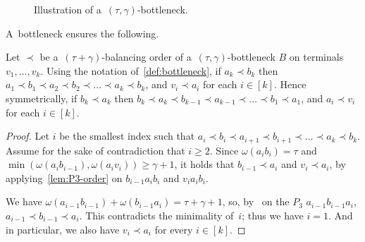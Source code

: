 \documentclass[a4paper,UKenglish,cleveref,hyperref,autoref]{lipics-v2021}
\newcommand{\weight}{\omega}
\begin{document}
\begin{figure}[h!]
\centering
\caption{Illustration of a~$(\tau,\gamma)$-bottleneck.}
\label{fig:bottleneck}
\end{figure}

A~bottleneck ensures the following.

\begin{lemma}\label{lem:bottle-order}
Let $\prec$ be a~$(\tau + \gamma)$-balancing order of a~$(\tau, \gamma)$-bottleneck $B$ on terminals $v_1, \dots, v_k$.
Using the notation of~\cref{def:bottleneck}, if $a_k \prec b_k$ then $a_1 \prec b_1 \prec a_2 \prec b_2 \prec \dots \prec a_k \prec b_k$, and $v_i \prec a_i$ for each $i \in [k]$.
Hence symmetrically, if $b_k \prec a_k$ then $b_k \prec a_k \prec b_{k-1} \prec a_{k-1} \prec \dots \prec b_1 \prec a_1$, and $a_i \prec v_i$ for each $i \in [k]$.
\end{lemma}

\begin{proof}
  Let $i$ be the smallest index such that $a_i \prec b_i \prec a_{i+1} \prec b_{i+1} \prec \dots \prec a_k \prec b_k$.
  Assume for the sake of contradiction that $i \geqslant 2$.
  Since $\weight(a_ib_i) = \tau$ and  $\min(\weight(a_ib_{i-1}), \weight(a_iv_i)) \geqslant \gamma+1$, it holds that $b_{i-1} \prec a_i$ and $v_i \prec a_i$, by applying~\cref{lem:P3-order} on $b_{i-1} a_i b_i$ and $v_i a_i b_i$.

We have $\weight(a_{i-1}b_{i-1}) + \weight(b_{i-1}a_i) = \tau + \gamma + 1$, so, by~ on the $P_3$ $a_{i-1}b_{i-1}a_i$, $a_{i-1} \prec b_{i-1} \prec a_i$.
This contradicts the minimality of~$i$; thus we have $i = 1$.
And in particular, we also have $v_i \prec a_i$ for every $i \in [k]$.
\end{proof}
\end{document}
